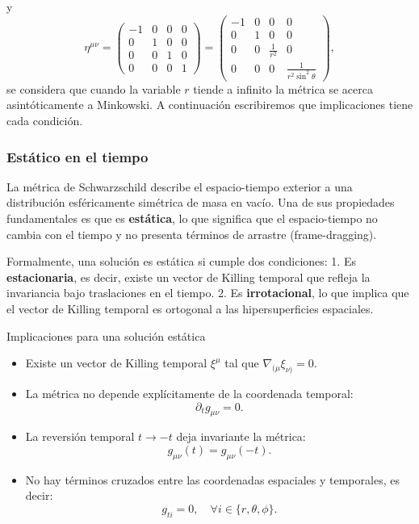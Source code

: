 y
\begin{equation}
    \eta^{\mu \nu}=\left(\begin{array}{cccc}
            -1 & 0 & 0 & 0 \\
            0  & 1 & 0 & 0 \\
            0  & 0 & 1 & 0 \\
            0  & 0 & 0 & 1
        \end{array}\right)=\left(\begin{array}{cccc}
            -1 & 0 & 0               & 0                                \\
            0  & 1 & 0               & 0                                \\
            0  & 0 & \frac{1}{r^{2}} & 0                                \\
            0  & 0 & 0               & \frac{1}{r^{2} \sin ^{2} \theta}
        \end{array}\right),
\end{equation}
se considera que cuando la variable $r$ tiende a infinito la métrica se acerca asintóticamente a Minkowski. A continuación escribiremos que implicaciones tiene cada condición.

\subsubsection*{Estático en el tiempo}

La métrica de Schwarzschild describe el espacio-tiempo exterior a una distribución esféricamente simétrica de masa en vacío. Una de sus propiedades fundamentales es que es \textbf{estática}, lo que significa que el espacio-tiempo no cambia con el tiempo y no presenta términos de arrastre (frame-dragging).

Formalmente, una solución es estática si cumple dos condiciones:
1. Es \textbf{estacionaria}, es decir, existe un vector de Killing temporal que refleja la invariancia bajo traslaciones en el tiempo.
2. Es \textbf{irrotacional}, lo que implica que el vector de Killing temporal es ortogonal a las hipersuperficies espaciales.

\begin{definition}{Implicaciones para una solución estática}{}
    \begin{itemize}
        \item Existe un vector de Killing temporal \( \xi^\mu \) tal que \( \nabla_{(\mu} \xi_{\nu)} = 0 \).
        \item La métrica no depende explícitamente de la coordenada temporal:
              \[ \partial_t g_{\mu \nu} = 0. \]
        \item La reversión temporal \( t \to -t \) deja invariante la métrica:
              \[ g_{\mu\nu}(t) = g_{\mu\nu}(-t). \]
        \item No hay términos cruzados entre las coordenadas espaciales y temporales, es decir:
              \[ g_{ti} = 0, \quad \forall i \in \{r, \theta, \phi\}. \]
    \end{itemize}
\end{definition}

